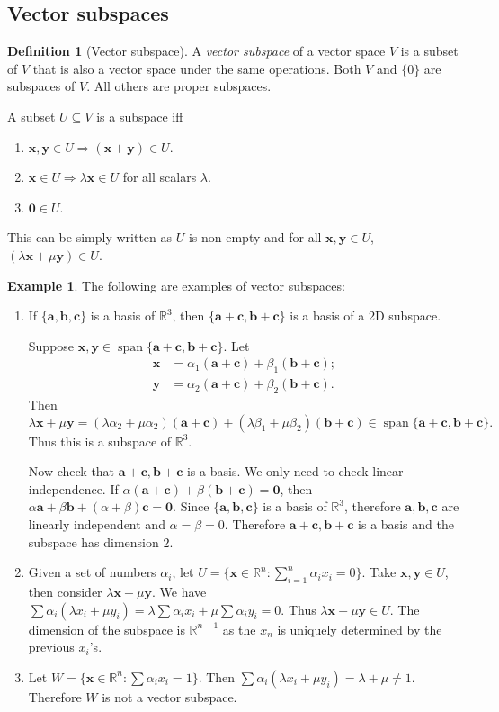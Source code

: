 \documentclass[a4paper]{article}
\theoremstyle{definition}
\newtheorem*{defi}{Definition}
\newtheorem*{eg}{Example}
\newcommand{\mb}[1]{\mathbf{#1}}
\newcommand{\R}{\mathbb{R}}
\DeclareMathOperator\spn{span}
\begin{document}
\subsection{Vector subspaces}
\begin{defi}[Vector subspace]
  A \emph{vector subspace} of a vector space $V$ is a subset of $V$ that is also a vector space under the same operations. Both $V$ and $\{0\}$ are subspaces of $V$. All others are proper subspaces.

A subset $U\subseteq V$ is a subspace iff
\begin{enumerate}
\item $\mb{x, y}\in U \Rightarrow (\mb{x + y}) \in U$.
\item $\mb{x}\in U \Rightarrow \lambda\mb{x} \in U$ for all scalars $\lambda$.
\item $\mb{0}\in U$.
\end{enumerate}
This can be simply written as $U$ is non-empty and  for all $\mb{x, y}\in U$, $(\lambda\mb{x} + \mu\mb{y})\in U$.
\end{defi}

\begin{eg}
  The following are examples of vector subspaces:
  \begin{enumerate}
  \item If $\{\mb{a, b, c}\}$ is a basis of $\R^3$, then $\{\mb{a + c, b + c}\}$ is a basis of a 2D subspace.

  Suppose $\mb{x, y}\in \spn\{\mb{a + c, b + c}\}$. Let
  \begin{align*}
    \mb{x} &= \alpha_1(\mb{a + c}) + \beta_1(\mb{b + c});\\
    \mb{y} &= \alpha_2(\mb{a + c}) + \beta_2(\mb{b + c}).
  \end{align*}
  Then
  \[
  \lambda\mb{x} + \mu\mb{y} = (\lambda\alpha_2+\mu\alpha_2)(\mb{a + c}) + (\lambda\beta_1 + \mu\beta_2)\mb{(b + c)}\in\spn\{\mb{a + c, b + c}\}.
  \]
  Thus this is a subspace of $\R^3$.

  Now check that $\mb{a + c, b + c}$ is a basis. We only need to check linear independence. If $\alpha(\mb{a + c}) + \beta(\mb{b + c}) = \mb{0}$, then $\alpha\mb{a} + \beta\mb{b} + (\alpha + \beta)\mb{c} = \mb{0}$. Since $\{\mb{a, b, c}\}$ is a basis of $\R^3$, therefore $\mb{a, b, c}$ are linearly independent and $\alpha = \beta = 0$. Therefore $\mb{a + c, b + c}$ is a basis and the subspace has dimension $2$.
  \item Given a set of numbers $\alpha_i$, let $U = \{\mb{x}\in \R^n: \sum_{i=1}^n \alpha_ix_i = 0\}$. Take $\mb{x, y}\in U$, then consider $\lambda\mb{x} + \mu\mb{y}$. We have $\sum\alpha_i(\lambda x_i + \mu y_i) = \lambda\sum\alpha_ix_i + \mu\sum\alpha_iy_i = 0$. Thus $\lambda\mb{x} + \mu\mb{y} \in U$. The dimension of the subspace is $\R^{n-1}$ as the $x_n$ is uniquely determined by the previous $x_i$'s.
  \item Let $W = \{\mb{x}\in \R^n: \sum \alpha_ix_i = 1\}$. Then $\sum\alpha_i(\lambda x_i + \mu y_i) = \lambda + \mu \not= 1$. Therefore $W$ is not a vector subspace.
  \end{enumerate}
\end{eg}
\end{document}
